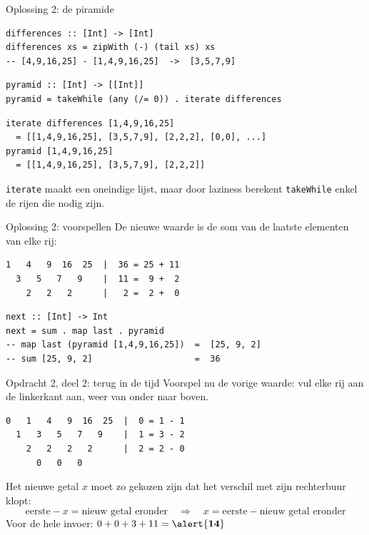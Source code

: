\documentclass[aspectratio=169,11pt]{beamer}
\newcommand{\hs}{\lstinline[style=hsinline]}
\begin{document}
\begin{frame}[fragile]{Oplossing 2: de piramide}
\begin{lstlisting}
differences :: [Int] -> [Int]
differences xs = zipWith (-) (tail xs) xs
-- [4,9,16,25] - [1,4,9,16,25]  ->  [3,5,7,9]
\end{lstlisting}
  \pause
\begin{lstlisting}
pyramid :: [Int] -> [[Int]]
pyramid = takeWhile (any (/= 0)) . iterate differences
\end{lstlisting}
\begin{lstlisting}
iterate differences [1,4,9,16,25]
  = [[1,4,9,16,25], [3,5,7,9], [2,2,2], [0,0], ...]
pyramid [1,4,9,16,25]
  = [[1,4,9,16,25], [3,5,7,9], [2,2,2]]
\end{lstlisting}
  \hs|iterate| maakt een \alert{oneindige} lijst, maar door laziness berekent
  \hs|takeWhile| enkel de rijen die nodig zijn.
\end{frame}

\begin{frame}[fragile]{Oplossing 2: voorspellen}
  De nieuwe waarde is de \alert{som van de laatste elementen} van elke rij:
\begin{lstlisting}
1   4   9  16  25  |  36 = 25 + 11
  3   5   7   9    |  11 =  9 +  2
    2   2   2      |   2 =  2 +  0
\end{lstlisting}
  \pause
\begin{lstlisting}
next :: [Int] -> Int
next = sum . map last . pyramid
-- map last (pyramid [1,4,9,16,25])  =  [25, 9, 2]
-- sum [25, 9, 2]                    =  36
\end{lstlisting}
\end{frame}

\begin{frame}[fragile]{Opdracht 2, deel 2: terug in de tijd}
  Voorspel nu de \alert{vorige} waarde: vul elke rij aan de \alert{linkerkant}
  aan, weer van \alert{onder naar boven}.
\begin{lstlisting}
0   1   4   9  16  25  |  0 = 1 - 1
  1   3   5   7   9    |  1 = 3 - 2
    2   2   2   2      |  2 = 2 - 0
      0   0   0
\end{lstlisting}
  \pause
  Het nieuwe getal \(x\) moet zo gekozen zijn dat het verschil met zijn
  rechterbuur klopt:
  \[ \text{eerste} - x = \text{nieuw getal eronder}
     \quad\Rightarrow\quad x = \text{eerste} - \text{nieuw getal eronder} \]
  \pause
  Voor de hele invoer: \(0 + 0 + 3 + 11 = \alert{\textbf{14}}\)
\end{frame}
\end{document}
